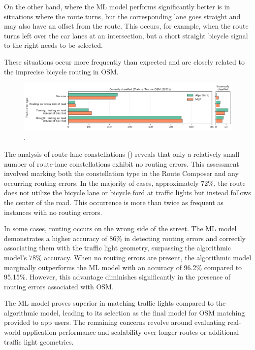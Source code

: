 On the other hand, where the ML model performs significantly better is in situations where the route turns, but the corresponding lane goes straight and may also have an offset from the route. This occurs, for example, when the route turns left over the car lanes at an intersection, but a short straight bicycle signal to the right needs to be selected.

These situations occur more frequently than expected and are closely related to the imprecise bicycle routing in OSM.

\begin{figure}[t]
\centering 
\includegraphics[width=\linewidth]{images/matching-route-errors-osm-old.pdf}
\caption{.}
\label{fig:matching-routing-errors-osm}
\end{figure}

The analysis of route-lane constellations () reveals that only a relatively small number of route-lane constellations exhibit no routing errors. This assessment involved marking both the constellation type in the Route Composer and any occurring routing errors. In the majority of cases, approximately 72\%, the route does not utilize the bicycle lane or bicycle ford at traffic lights but instead follows the center of the road. This occurrence is more than twice as frequent as instances with no routing errors.

In some cases, routing occurs on the wrong side of the street. The ML model demonstrates a higher accuracy of 86\% in detecting routing errors and correctly associating them with the traffic light geometry, surpassing the algorithmic model's 78\% accuracy. When no routing errors are present, the algorithmic model marginally outperforms the ML model with an accuracy of 96.2\% compared to 95.15\%. However, this advantage diminishes significantly in the presence of routing errors associated with OSM.

The ML model proves superior in matching traffic lights compared to the algorithmic model, leading to its selection as the final model for OSM matching provided to app users. The remaining concerns revolve around evaluating real-world application performance and scalability over longer routes or additional traffic light geometries.

